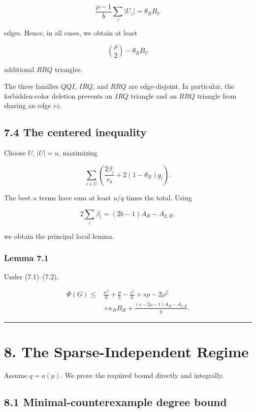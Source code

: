 \documentclass[
  11pt,
]{article}
\begin{document}
\[
\frac{\rho-1}{b}\sum_z|U_z|
=
\theta_RB_U
\]

edges. Hence, in all cases, we obtain at least

\[
\binom\rho2-\theta_RB_U
\]

additional \(RRQ\) triangles.

The three families \(QQI\), \(IRQ\), and \(RRQ\) are edge-disjoint. In
particular, the forbidden-color deletion prevents an \(IRQ\) triangle
and an \(RRQ\) triangle from sharing an edge \(rz\).

\subsection{7.4 The centered inequality}\label{the-centered-inequality}

Choose \(U\), \(|U|=u\), maximizing

\[
\sum_{i\in U}
\left(
\frac{2\beta_i}{r_b}+2(1-\theta_R)g_i
\right).
\]

The best \(u\) terms have sum at least \(u/q\) times the total. Using

\[
2\sum_i\beta_i
=(2b-1)A_R-A_{2,R},
\]

we obtain the principal local lemma.

\subsubsection{Lemma 7.1}\label{lemma-7.1-reserved-gain-shifted-center-inequality}

Under (7.1)--(7.2),

\[
\boxed{
\begin{aligned}
\Phi(G)
\le{}&
\frac{n^2}{6}+\frac p2-\frac{s^2}{6}
+s\rho-2\rho^2\\
&+
\kappa_RB_R
+
\frac{(s-2\rho-1)A_R-A_{2,R}}q.
\end{aligned}
}
\tag{7.6}
\]

\begin{center}\rule{0.5\linewidth}{0.5pt}\end{center}

\section{8. The Sparse-Independent
Regime}\label{the-sparse-independent-regime}

Assume \(q=o(p)\). We prove the required bound directly and integrally.

\subsection{8.1 Minimal-counterexample degree
bound}\label{minimal-counterexample-degree-bound}
\end{document}
